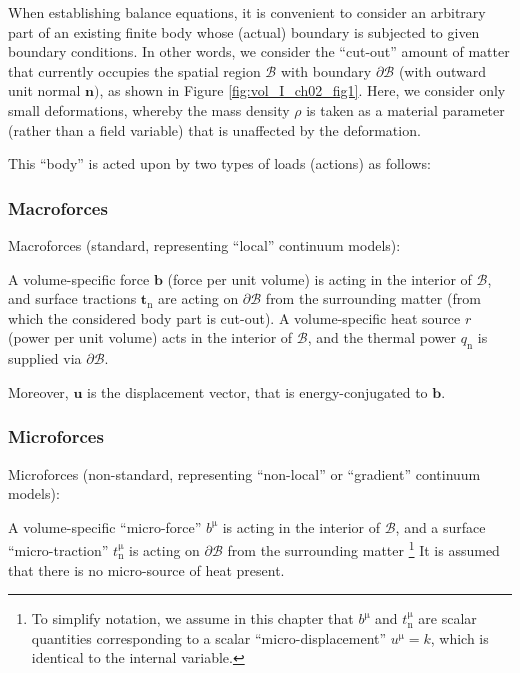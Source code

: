 When establishing balance equations, it is convenient to consider an arbitrary part
of an existing finite body whose (actual) boundary is subjected to given boundary 
conditions. In other words, we consider the ``cut-out'' amount of matter that 
currently occupies the spatial region ${\mathcal B}$ with boundary  
$\partial {\mathcal B}$ (with outward unit normal ${\bm n})$, as shown in Figure
\ref{fig:vol_I_ch02_fig1}. Here, we consider only small deformations, whereby
the mass density $\rho$ is taken as a material parameter
(rather than a field variable) that is unaffected by the deformation.

This ``body'' is acted upon by two types of loads (actions) as follows:

\subsubsection{Macroforces}

 Macroforces (standard, representing ``local'' continuum models):

A volume-specific force ${\bm b}$ (force per unit volume) is acting in 
the interior of ${\mathcal B}$, and surface tractions ${\bm t}_{\mathrm{n}}$ are 
acting on $\partial {\mathcal B}$ from the surrounding matter 
(from which the considered body part is cut-out). 
A volume-specific heat source $r$ (power per unit volume) acts in the interior
of ${\mathcal B}$, and the thermal power $q_{\mathrm{n}}$ is supplied
via $\partial {\mathcal B}$. 

Moreover, ${\bm u}$ is the displacement vector, that is energy-conjugated to 
${\bm b}$.

\subsubsection{Microforces}
 Microforces (non-standard, representing ``non-local'' or ``gradient'' 
continuum models):

A volume-specific ``micro-force'' $b^{\mathrm{\mu}}$ is acting in the interior 
of ${\mathcal B}$, and a surface ``micro-traction'' $t_{\mathrm{n}}^{\mathrm{\mu}}$
is acting on $\partial {\mathcal B}$ from the surrounding matter
\footnote{To simplify notation, we assume in this chapter that $b^{\mathrm{\mu}}$ 
and $t_{\mathrm{n}}^{\mathrm{\mu}}$ are scalar 
quantities corresponding to a scalar ``micro-displacement'' $u^{\mathrm{\mu}}=k$,
which is identical to the internal variable.} It is assumed that there is 
no micro-source of heat present.

